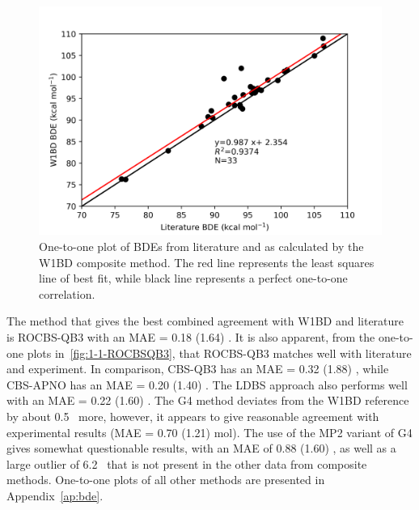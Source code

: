 \begin{figure}[H]
  \centering
  \includegraphics[width=\textwidth]{figures/lit-w1bd}
  \caption[One-to-one plot of BDEs from literature and as calculated by the W1BD composite method.]{One-to-one plot of BDEs from literature\protect\cite{Luo2002} and as calculated by the W1BD composite method. The red line represents the least squares line of best fit, while black line represents a perfect one-to-one correlation.}
  \label{fig:1-1-W1BD}
\end{figure}

The method that gives the best combined agreement with W1BD and literature is ROCBS-QB3 with an MAE = 0.18 (1.64) \kcalmol. It is also apparent, from the one-to-one plots in~\ref{fig:1-1-ROCBSQB3}, that ROCBS-QB3 matches well with literature and experiment. In comparison, CBS-QB3 has an MAE = 0.32 (1.88) \kcalmol, while CBS-APNO has an MAE = 0.20 (1.40) \kcalmol. The LDBS approach also performs well with an MAE = 0.22 (1.60) \kcalmol. The G4 method deviates from the W1BD reference by about 0.5 \kcalmol\ more, however, it appears to give reasonable agreement with experimental results (MAE = 0.70 (1.21) mol). The use of the MP2 variant of G4 gives somewhat questionable results, with an MAE of 0.88 (1.60) \kcalmol, as well as a large outlier of 6.2 \kcalmol\ that is not present in the other data from composite methods. One-to-one plots of all other methods are presented in Appendix~\ref{ap:bde}.

